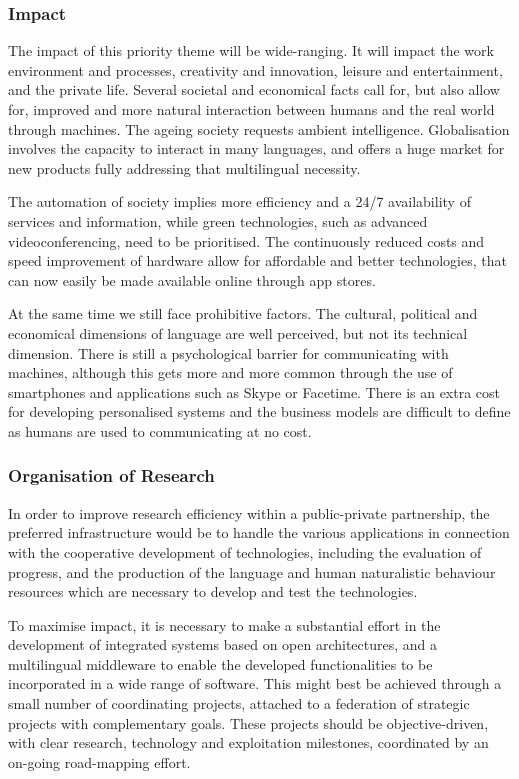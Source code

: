 \documentclass[10pt, plain]{../../metanetpaper}
\begin{document}
\begin{multicols}{2}
\subsubsection{Impact}
\label{sec:impact-pt3}

The impact of this priority theme will be wide-ranging. It will impact the work environment and processes, creativity and innovation, leisure and entertainment, and the private life. Several societal and economical facts call for, but also allow for, improved and more natural interaction between humans and the real world through machines. The ageing society requests ambient intelligence. Globalisation involves the capacity to interact in many languages, and offers a huge market for new products fully addressing that multilingual necessity.
 
The automation of society implies more efficiency and a 24/7 availability of services and information, while green technologies, such as advanced videoconferencing, need to be prioritised. The continuously reduced costs and speed improvement of hardware allow for affordable and better technologies, that can now easily be made available online through app stores.
 
At the same time we still face prohibitive factors. The cultural, political and economical dimensions of language are well perceived, but not its technical dimension. There is still a psychological barrier for communicating with machines, although this gets more and more common through the use of smartphones and applications such as Skype or Facetime. There is an extra cost for developing personalised systems and the business models are difficult to define as humans are used to communicating at no cost.

\subsubsection{Organisation of Research}
\label{sec:organ-rese-pt3}

In order to improve research efficiency within a public-private partnership, the preferred infrastructure would be to handle the various applications in connection with the cooperative development of technologies, including the evaluation of progress, and the production of the language and human naturalistic behaviour resources which are necessary to develop and test the technologies.
 
To maximise impact, it is necessary to make a substantial effort in the development of integrated systems based on open architectures, and a multilingual middleware to enable the developed functionalities to be incorporated in a wide range of software. This might best be achieved through a small number of coordinating projects, attached to a federation of strategic projects with complementary goals. These projects should be objective-driven, with clear research, technology and exploitation milestones, coordinated by an on-going road-mapping effort.
 

\end{multicols}
\end{document}
